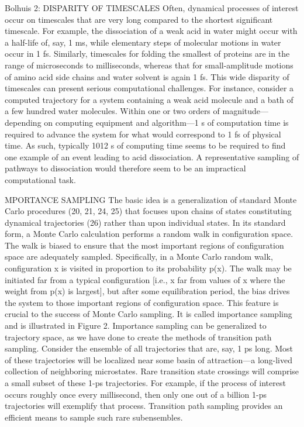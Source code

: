 \documentclass[]{cam-thesis}
\begin{document}
Bolhuis 2:
DISPARITY OF TIMESCALES Often, dynamical processes of interest occur on timescales that are very long compared to the shortest significant timescale. For example, the dissociation of a weak acid in water might occur with a half-life of, say, 1 ms, while elementary steps of molecular motions in water occur in 1 fs. Similarly, timescales for folding the smallest of proteins are in the range of microseconds to milliseconds, whereas that for small-amplitude motions of amino acid side chains and water solvent is again 1 fs. This wide disparity of timescales can present serious computational challenges. For instance, consider a computed trajectory for a system containing a weak acid molecule and a bath of a few hundred water molecules. Within one or two orders of magnitude—depending on computing equipment and algorithm—1 s of computation time is required to advance the system for what would correspond to 1 fs of physical time. As such, typically 1012 s of computing time seems to be required to find one example of an event leading to acid dissociation. A representative sampling of pathways to dissociation would therefore seem to be an impractical computational task.

MPORTANCE SAMPLING The basic idea is a generalization of standard Monte Carlo procedures (20, 21, 24, 25) that focuses upon chains of states constituting dynamical trajectories (26) rather than upon individual states. In its standard form, a Monte Carlo calculation performs a random walk in configuration space. The walk is biased to ensure that the most important regions of configuration space are adequately sampled. Specifically, in a Monte Carlo random walk, configuration x is visited in proportion to its probability p(x). The walk may be initiated far from a typical configuration [i.e., x far from values of x where the weight from p(x) is largest], but after some equilibration period, the bias drives the system to those important regions of configuration space. This feature is crucial to the success of Monte Carlo sampling. It is called importance sampling and is illustrated in Figure 2. Importance sampling can be generalized to trajectory space, as we have done to create the methods of transition path sampling. Consider the ensemble of all trajectories that are, say, 1 ps long. Most of these trajectories will be localized near some basin of attraction—a long-lived collection of neighboring microstates. Rare transition state crossings will comprise a small subset of these 1-ps trajectories. For example, if the process of interest occurs roughly once every millisecond, then only one out of a billion 1-ps trajectories will exemplify that process. Transition path sampling provides an efficient means to sample such rare subensembles.
\end{document}

